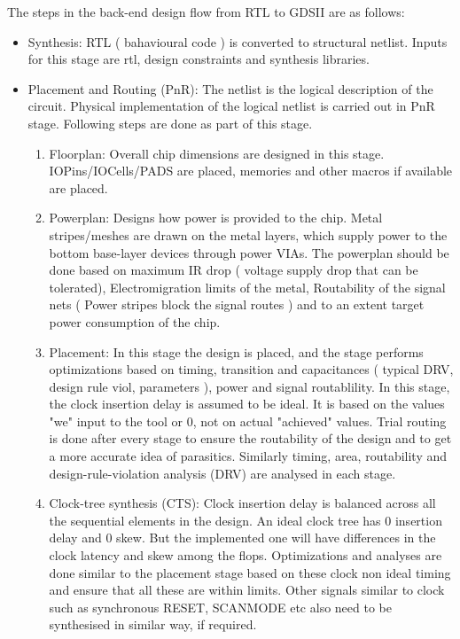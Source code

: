 \documentclass[12pt]{article}
\begin{document}
  The steps in the back-end design flow from RTL to GDSII are as
  follows:
  \begin{itemize}
  \item Synthesis:
    RTL ( bahavioural code ) is converted to structural netlist.
    Inputs for this stage are rtl, design constraints and synthesis libraries.
    
  \item Placement and Routing (PnR):
    The netlist is the logical description of the circuit. Physical implementation of the 
    logical netlist is carried out in PnR stage.
    Following steps are done as part of this stage.
    \begin{enumerate}
    \item Floorplan: Overall chip dimensions are designed in this stage.
      IOPins/IOCells/PADS are placed, memories and other macros if available are placed.
      
    \item Powerplan: Designs how power is provided to the chip.
      Metal stripes/meshes are drawn on the metal layers, which supply power to the 
      bottom base-layer devices through power VIAs. 
      The powerplan should be done based on maximum IR drop ( voltage supply drop that 
      can be tolerated), Electromigration limits of the metal, Routability of the signal nets 
      ( Power stripes block the signal routes ) and to an extent target power consumption 
      of the chip.
      
    \item Placement: In this stage the design is placed, and the stage performs optimizations based on 
      timing, transition 
      and capacitances ( typical DRV, design rule viol, parameters ), power and signal routablility.
      In this stage, the clock insertion delay is assumed to be ideal. It is based on the values 
      "we" input to the tool or 0, not on actual "achieved" values.
      Trial routing is done after every stage to ensure the routability of the design and to get a 
      more accurate idea of parasitics.
      Similarly timing, area, routability and design-rule-violation analysis (DRV) are analysed in 
      each stage.
      
    \item Clock-tree synthesis (CTS): Clock insertion delay is balanced across all the sequential elements 
      in the design. An ideal clock tree has 0 insertion delay and 0 skew. But the implemented one will have 
      differences in the clock latency and skew among the flops. Optimizations and analyses are done similar 
      to the placement stage based on these clock non ideal timing and ensure that all these are within limits.
      Other signals similar to clock such as synchronous RESET, SCANMODE etc also need to be synthesised in 
      similar way, if required.
      

\end{enumerate}
\end{itemize}
\end{document}
